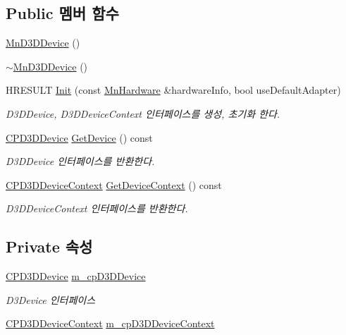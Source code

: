 \subsection*{Public 멤버 함수}
\begin{DoxyCompactItemize}
\item 
\hyperlink{class_m_n_l_1_1_mn_d3_d_device_a73cd90c6f415ae81a05cdb11303c1d51}{Mn\+D3\+D\+Device} ()
\item 
\hyperlink{class_m_n_l_1_1_mn_d3_d_device_abdd98dae30351ff08198db0f97f6ffd9}{$\sim$\+Mn\+D3\+D\+Device} ()
\item 
H\+R\+E\+S\+U\+LT \hyperlink{class_m_n_l_1_1_mn_d3_d_device_aada86462878af0f620871fc4b9836edc}{Init} (const \hyperlink{class_m_n_l_1_1_mn_hardware}{Mn\+Hardware} \&hardware\+Info, bool use\+Default\+Adapter)
\begin{DoxyCompactList}\small\item\em D3\+D\+Device, D3\+D\+Device\+Context 인터페이스를 생성, 초기화 한다. \end{DoxyCompactList}\item 
\hyperlink{namespace_m_n_l_a1eec210db8f309a4a9ac0d9658784c31}{C\+P\+D3\+D\+Device} \hyperlink{class_m_n_l_1_1_mn_d3_d_device_a0143842e6feb74a12d6849914c1beb46}{Get\+Device} () const
\begin{DoxyCompactList}\small\item\em D3\+D\+Device 인터페이스를 반환한다. \end{DoxyCompactList}\item 
\hyperlink{namespace_m_n_l_aab3aabb6c9360e44ddc8b0bb563c2107}{C\+P\+D3\+D\+Device\+Context} \hyperlink{class_m_n_l_1_1_mn_d3_d_device_aef186783679d2fd2ad183cca0bcf9299}{Get\+Device\+Context} () const
\begin{DoxyCompactList}\small\item\em D3\+D\+Device\+Context 인터페이스를 반환한다. \end{DoxyCompactList}\end{DoxyCompactItemize}
\subsection*{Private 속성}
\begin{DoxyCompactItemize}
\item 
\hyperlink{namespace_m_n_l_a1eec210db8f309a4a9ac0d9658784c31}{C\+P\+D3\+D\+Device} \hyperlink{class_m_n_l_1_1_mn_d3_d_device_a799a2d8f1c5b2c3fdc2e003952279a4f}{m\+\_\+cp\+D3\+D\+Device}
\begin{DoxyCompactList}\small\item\em D3\+Device 인터페이스 \end{DoxyCompactList}\item 
\hyperlink{namespace_m_n_l_aab3aabb6c9360e44ddc8b0bb563c2107}{C\+P\+D3\+D\+Device\+Context} \hyperlink{class_m_n_l_1_1_mn_d3_d_device_a718aa02b1c1e40c4f3b91b6a3c68eff2}{m\+\_\+cp\+D3\+D\+Device\+Context}
\end{DoxyCompactItemize}


